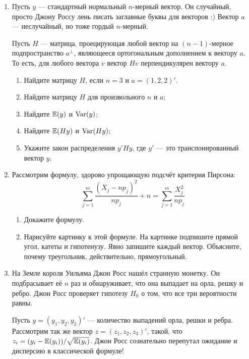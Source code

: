 \begin{enumerate}
\item Пусть $y$ — стандартный нормальный $n$-мерный вектор. 
Он случайный, просто Джону Россу лень писать заглавные буквы для векторов :) 
Вектор $a$ — неслучайный, но тоже гордый $n$-мерный.

Пусть $H$ — матрица, проецирующая любой вектор на $(n-1)$-мерное подпространство $a^{\perp}$, 
являющееся ортогональным дополнением к вектору $a$. 
То есть, для любого вектора $v$ вектор $Hv$ перпендикулярен вектору $a$.

\begin{enumerate}
    \item Найдите матрицу $H$, если $n=3$ и $a=(1,2,2)'$.
    \item Найдите матрицу $H$ для произвольного $n$ и $a$;
    \item Найдите $\operatorname{\mathbb{E}}(y)$ и $\operatorname{Var}(y)$;
    \item Найдите $\operatorname{\mathbb{E}}(Hy)$ и $\operatorname{Var}(Hy)$;
    \item Укажите закон распределения $y'Hy$, где $y'$ — это транспонированный вектор $y$.
\end{enumerate}

\item Рассмотрим формулу, здорово упрощающую подсчёт критерия Пирсона:
\[
 \sum_{j=1}^m \frac{(X_j - np_j)^2}{np_j} + n = \sum_{j=1}^m \frac{X_j^2}{np_j}
\]

\begin{enumerate}
    \item Докажите формулу.
    \item Нарисуйте картинку к этой формуле. На картинке подпишите прямой угол, катеты и гипотенузу. 
    Явно запишите каждый вектор. Объясните, почему треугольник, действительно, прямоугольный. 
\end{enumerate}


\item На Земле короля Уильяма Джон Росс нашёл странную монетку. 
Он подбрасывает её $n$ раз и обнаруживает, что она выпадает на орла, решку и ребро. 
Джон Росс проверяет гипотезу $H_0$ о том, что все три вероятности равны.

Пусть $y = (y_1, y_2, y_3)'$ — количество выпадений орла, решки и ребра. Рассмотрим так же вектор
$z = (z_1, z_2, z_3)'$, такой, что $z_i = (y_i - \operatorname{\mathbb{E}}(y_i)) / \sqrt{\operatorname{\mathbb{E}}(y_i)}$. 
Джон Росс сознательно перепутал ожидание и дисперсию в классической формуле!


\end{enumerate}
